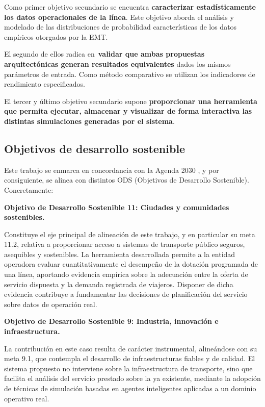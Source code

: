 Como primer objetivo secundario se encuentra \textbf{caracterizar estadísticamente los datos operacionales de la línea}. Este objetivo aborda
el análisis y modelado de las distribuciones de probabilidad características de los datos empíricos otorgados por la EMT.

El segundo de ellos radica en~\textbf{validar que ambas propuestas arquitectónicas generan resultados equivalentes} dados los mismos parámetros
de entrada. Como método comparativo se utilizan los indicadores de rendimiento especificados.

El tercer y último objetivo secundario supone \textbf{proporcionar una herramienta que permita ejecutar, almacenar y visualizar de forma
interactiva las distintas simulaciones generadas por el sistema}.

\subsection{Objetivos de desarrollo sostenible}

Este trabajo se enmarca en concordancia con la Agenda 2030 \cite{onu_ods}, y por consiguiente, se alinea
con distintos ODS (Objetivos de Desarrollo Sostenible). Concretamente:

\textbf{Objetivo de Desarrollo Sostenible 11: Ciudades y comunidades sostenibles.}

Constituye el eje principal de alineación de este trabajo, y en particular su meta 11.2,
relativa a proporcionar acceso a sistemas de transporte público seguros, asequibles y
sostenibles. La herramienta desarrollada permite a la entidad operadora evaluar
cuantitativamente el desempeño de la dotación programada de una línea, aportando evidencia
empírica sobre la adecuación entre la oferta de servicio dispuesta y la demanda registrada
de viajeros. Disponer de dicha evidencia contribuye a fundamentar las decisiones de
planificación del servicio sobre datos de operación real.

\textbf{Objetivo de Desarrollo Sostenible 9: Industria, innovación e infraestructura.}

La contribución en este caso resulta de carácter instrumental, alineándose con su meta 9.1,
que contempla el desarrollo de infraestructuras fiables y de calidad. El sistema propuesto
no interviene sobre la infraestructura de transporte, sino que facilita el análisis del
servicio prestado sobre la ya existente, mediante la adopción de técnicas de simulación
basadas en agentes inteligentes aplicadas a un dominio operativo real.

